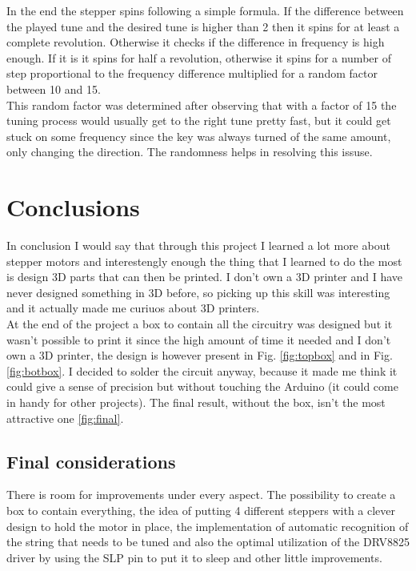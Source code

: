 \documentclass[a4paper,12pt]{article}
\begin{document}
\begin{multicols}{2}
In the end the stepper spins following a simple formula. If the difference between the played tune and the desired tune is higher than 2 then it spins for at least a complete revolution. Otherwise it checks if the difference in frequency is high enough. If it is it spins for half a revolution, otherwise it spins for a number of step proportional to the frequency difference multiplied for a random factor between 10 and 15.\\
This random factor was determined after observing that with a factor of 15 the tuning process would usually get to the right tune pretty fast, but it could get stuck on some frequency since the key was always turned of the same amount, only changing the direction. The randomness helps in resolving this issuse.
\section{Conclusions}
In conclusion I would say that through this project I learned a lot more about stepper motors and interestengly enough the thing that I learned to do the most is design 3D parts that can then be printed. I don't own a 3D printer and I have never designed something in 3D before, so picking up this skill was interesting and it actually made me curiuos about 3D printers.\\
At the end of the project a box to contain all the circuitry was designed but it wasn't possible to print it since the high amount of time it needed and I don't own a 3D printer, the design is however present in Fig. \ref{fig:topbox} and in Fig. \ref{fig:botbox}. I decided to solder the circuit anyway, because it made me think it could give a sense of precision but without touching the Arduino (it could come in handy for other projects). The final result, without the box, isn't the most attractive one \ref{fig:final}.
\subsection{Final considerations}
There is room for improvements under every aspect. The possibility to create a box to contain everything, the idea of putting 4 different steppers with a clever design to hold the motor in place, the implementation of automatic recognition of the string that needs to be tuned and also the optimal utilization of the DRV8825 driver by using the SLP pin to put it to sleep and other little improvements.
\end{multicols}
\newpage
\end{document}
